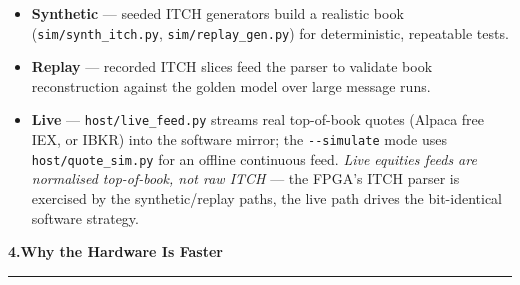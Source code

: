 \documentclass[10pt,a4paper]{article}
\newcommand{\sectionrule}{\par\nobreak\vspace{1pt}\textcolor{rulegray}{\rule{\linewidth}{0.8pt}}\par\vspace{1pt}}
\newcommand{\fpath}[1]{\texttt{\textcolor{hdrblue}{#1}}}
\begin{document}
\begin{itemize}[leftmargin=1.4em, topsep=2pt, itemsep=1pt]
\item \textbf{Synthetic} --- seeded ITCH generators build a realistic book
  (\fpath{sim/synth\_itch.py}, \fpath{sim/replay\_gen.py}) for deterministic,
  repeatable tests.
\item \textbf{Replay} --- recorded ITCH slices feed the parser to validate book
  reconstruction against the golden model over large message runs.
\item \textbf{Live} --- \fpath{host/live\_feed.py} streams real top-of-book
  quotes (Alpaca free IEX, or IBKR) into the software mirror; the
  \texttt{-{}-simulate} mode uses \fpath{host/quote\_sim.py} for an offline
  continuous feed. \emph{Live equities feeds are normalised top-of-book, not raw
  ITCH} --- the FPGA's ITCH parser is exercised by the synthetic/replay paths,
  the live path drives the bit-identical software strategy.
\end{itemize}

{\large\bfseries\color{hdrblue} 4.\quad Why the Hardware Is Faster}
\sectionrule
\end{document}
